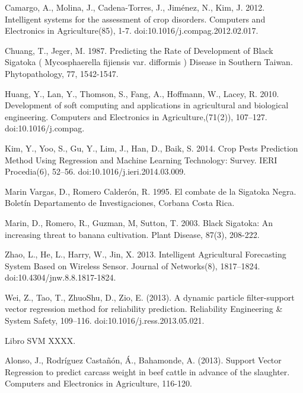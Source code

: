 \documentclass[review]{elsarticle}
\begin{document}
\begin{thebibliography}{1}


 Camargo, A., Molina, J., Cadena-Torres, J., Jiménez, N., Kim, J. 2012. Intelligent systems for the assessment of crop disorders. Computers and Electronics in Agriculture(85), 1-7. doi:10.1016/j.compag.2012.02.017.

 Chuang, T., Jeger, M. 1987. Predicting the Rate of Development of Black Sigatoka ( Mycosphaerella fijiensis var. difformis ) Disease in Southern Taiwan. Phytopathology, 77, 1542-1547.

 Huang, Y., Lan, Y., Thomson, S., Fang, A., Hoffmann, W., Lacey, R. 2010. Development of soft computing and applications in agricultural and biological engineering. Computers and Electronics in Agriculture,(71(2)), 107–127. doi:10.1016/j.compag.

 Kim, Y., Yoo, S., Gu, Y., Lim, J., Han, D.,  Baik, S. 2014. Crop Pests Prediction Method Using Regression and Machine Learning Technology: Survey. IERI Procedia(6), 52–56. doi:10.1016/j.ieri.2014.03.009.

 Marin Vargas, D., Romero Calderón, R. 1995. El combate de la Sigatoka Negra. Boletín Departamento de Investigaciones, Corbana Costa Rica.


 Marin, D., Romero, R., Guzman, M, Sutton, T. 2003. Black Sigatoka: An increasing threat to banana cultivation. Plant Disease, 87(3), 208-222.


Zhao, L., He, L., Harry, W., Jin, X. 2013. Intelligent Agricultural Forecasting System Based on Wireless Sensor. Journal of Networks(8), 1817–1824. doi:10.4304/jnw.8.8.1817-1824.

 Wei, Z., Tao, T., ZhuoShu, D.,  Zio, E. (2013). A dynamic particle filter-support vector regression method for reliability prediction. Reliability Engineering \& System Safety, 109–116. doi:10.1016/j.ress.2013.05.021.

 Libro SVM XXXX.

 Alonso, J., Rodríguez Castañón, Á., Bahamonde, A. (2013). Support Vector Regression to predict carcass weight in beef cattle in advance of the slaughter. Computers and Electronics in Agriculture, 116-120.


\end{thebibliography}
\end{document}
